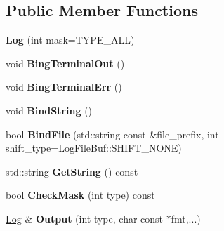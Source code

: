 \subsection*{Public Member Functions}
\begin{DoxyCompactItemize}
\item 
\hypertarget{classlsf_1_1util_1_1Log_a0f76c7b06dc2823eafa7fe00dc69f591}{
{\bfseries Log} (int mask=TYPE\_\-ALL)}
\label{classlsf_1_1util_1_1Log_a0f76c7b06dc2823eafa7fe00dc69f591}

\item 
\hypertarget{classlsf_1_1util_1_1Log_af43efc7e78a71ede2722da13702bface}{
void {\bfseries BingTerminalOut} ()}
\label{classlsf_1_1util_1_1Log_af43efc7e78a71ede2722da13702bface}

\item 
\hypertarget{classlsf_1_1util_1_1Log_a70e096378d7a63eecadac889b803971e}{
void {\bfseries BingTerminalErr} ()}
\label{classlsf_1_1util_1_1Log_a70e096378d7a63eecadac889b803971e}

\item 
\hypertarget{classlsf_1_1util_1_1Log_ab849a70a59e38153cd38b7a1b9726a05}{
void {\bfseries BindString} ()}
\label{classlsf_1_1util_1_1Log_ab849a70a59e38153cd38b7a1b9726a05}

\item 
\hypertarget{classlsf_1_1util_1_1Log_a35d0b839dfe610cd0e1aa724d208a118}{
bool {\bfseries BindFile} (std::string const \&file\_\-prefix, int shift\_\-type=LogFileBuf::SHIFT\_\-NONE)}
\label{classlsf_1_1util_1_1Log_a35d0b839dfe610cd0e1aa724d208a118}

\item 
\hypertarget{classlsf_1_1util_1_1Log_a66b67b19b61edea8c81bc1f548d465e5}{
std::string {\bfseries GetString} () const }
\label{classlsf_1_1util_1_1Log_a66b67b19b61edea8c81bc1f548d465e5}

\item 
\hypertarget{classlsf_1_1util_1_1Log_aa29de9ba6ef48964d962c6c30f78c586}{
bool {\bfseries CheckMask} (int type) const }
\label{classlsf_1_1util_1_1Log_aa29de9ba6ef48964d962c6c30f78c586}

\item 
\hypertarget{classlsf_1_1util_1_1Log_ac71086ae3995e25779e4951837474580}{
\hyperlink{classlsf_1_1util_1_1Log}{Log} \& {\bfseries Output} (int type, char const $\ast$fmt,...)}
\label{classlsf_1_1util_1_1Log_ac71086ae3995e25779e4951837474580}

\end{DoxyCompactItemize}
